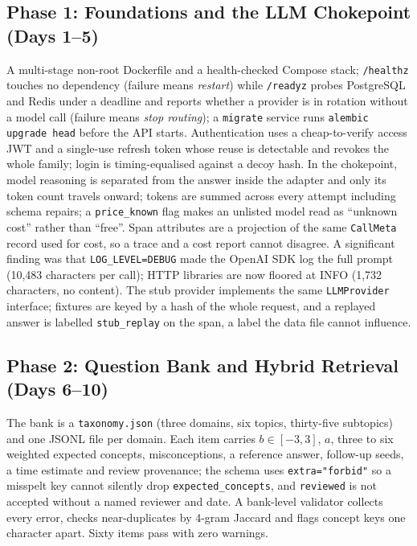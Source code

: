 \documentclass{tietreport}
\begin{document}
\subsection{Phase 1: Foundations and the LLM Chokepoint (Days 1--5)}

A multi-stage non-root Dockerfile and a health-checked Compose stack; \texttt{/healthz} touches
no dependency (failure means \emph{restart}) while \texttt{/readyz} probes PostgreSQL and Redis
under a deadline and reports whether a provider is in rotation without a model call (failure
means \emph{stop routing}); a \texttt{migrate} service runs \texttt{alembic upgrade head} before the
API starts. Authentication uses a cheap-to-verify access JWT and a single-use refresh token whose reuse is detectable and revokes the whole family; login is timing-equalised against a decoy hash. In the chokepoint, model reasoning is separated
from the answer inside the adapter and only its token count travels onward; tokens are summed
across every attempt including schema repairs; a \texttt{price\_known} flag makes an unlisted model
read as ``unknown cost'' rather than ``free''. Span attributes are a projection of the same
\texttt{CallMeta} record used for cost, so a trace and a cost report cannot disagree. A significant
finding was that \texttt{LOG\_LEVEL=DEBUG} made the OpenAI SDK log the full prompt (10,483
characters per call); HTTP libraries are now floored at INFO (1,732 characters, no content). The stub provider implements the same \texttt{LLMProvider} interface; fixtures are keyed by a hash of the whole request, and a replayed answer is labelled \texttt{stub\_replay} on the span, a label the data file cannot influence.

\subsection{Phase 2: Question Bank and Hybrid Retrieval (Days 6--10)}

The bank is a \texttt{taxonomy.json} (three domains, six topics, thirty-five subtopics) and one
JSONL file per domain. Each item carries $b\in[-3,3]$, $a$, three to six weighted expected
concepts, misconceptions, a reference answer, follow-up seeds, a time estimate and review
provenance; the schema uses \texttt{extra="forbid"} so a misspelt key cannot silently drop
\texttt{expected\_concepts}, and \texttt{reviewed} is not accepted without a named reviewer and date. A
bank-level validator collects every error, checks near-duplicates by 4-gram Jaccard and flags
concept keys one character apart. Sixty items pass with zero warnings.
\end{document}
